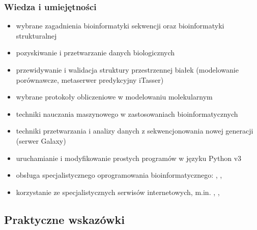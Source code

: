 \begin{frame}
\frametitle{Wiedza i umiejętności}
\scriptsize


\begin{itemize}

 \item wybrane zagadnienia bioinformatyki sekwencji oraz
 bioinformatyki strukturalnej

 \item pozyskiwanie i przetwarzanie danych biologicznych

 \item przewidywanie i walidacja struktury przestrzennej białek
 (modelowanie porównawcze, metaserwer predykcyjny iTasser)

 \item wybrane protokoły obliczeniowe w modelowaniu molekularnym

 \item techniki nauczania maszynowego w zastosowaniach bioinformatycznych

 \item techniki przetwarzania i analizy danych z sekwencjonowania
 nowej generacji (serwer Galaxy)

\end{itemize}


\begin{itemize}

 \item uruchamianie i modyfikowanie prostych programów w języku Python
 v3

 \item obsługa specjalistycznego oprogramowania
 bioinformatycznego: , , 

 \item korzystanie ze specjalistycznych serwisów internetowych,
 m.in. , , 

\end{itemize}
\end{frame}

\subsection{Praktyczne wskazówki}

